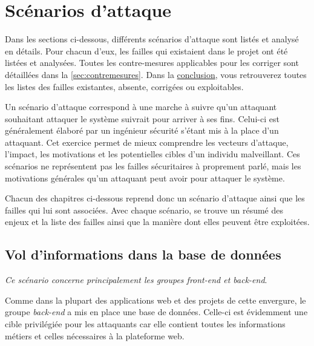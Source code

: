 \section{Scénarios d'attaque}
\label{sec:scenarios}

Dans les sections ci-dessous, différents scénarios d'attaque sont listés et analysé en détails. Pour chacun d'eux, les failles qui existaient dans le projet ont été listées et analysées. Toutes les contre-mesures applicables pour les corriger sont détaillées dans la \autoref{sec:contremesures}. Dans la \hyperref[sec:conclusion]{conclusion}, vous retrouverez toutes les listes des failles existantes, absente, corrigées ou exploitables.

Un scénario d'attaque correspond à une marche à suivre qu'un attaquant souhaitant attaquer le système suivrait pour arriver à ses fins. Celui-ci est généralement élaboré par un ingénieur sécurité s'étant mis à la place d'un attaquant. Cet exercice permet de mieux comprendre les vecteurs d'attaque, l'impact, les motivations et les potentielles cibles d'un individu malveillant. Ces scénarios ne représentent pas les failles sécuritaires à proprement parlé, mais les motivations générales qu'un attaquant peut avoir pour attaquer le système.

Chacun des chapitres ci-dessous reprend donc un scénario d'attaque ainsi que les failles qui lui sont associées. Avec chaque scénario, se trouve un résumé des enjeux et la liste des failles ainsi que la manière dont elles peuvent être exploitées.

\subsection{Vol d'informations dans la base de données}

\emph{Ce scénario concerne principalement les groupes front-end et back-end}.
\medskip

Comme dans la plupart des applications web et des projets de cette envergure, le groupe \emph{back-end} a mis en place une base de données. Celle-ci est évidemment une cible privilégiée pour les attaquants car elle contient toutes les informations métiers et celles nécessaires à la plateforme web.
\medskip

